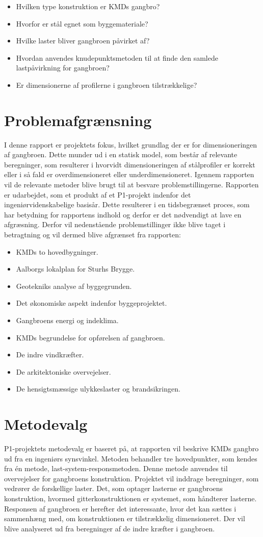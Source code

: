\begin{itemize}
\item Hvilken type konstruktion er KMDs gangbro?
\item Hvorfor er stål egnet som byggemateriale?
\item Hvilke laster bliver gangbroen påvirket af?
\item Hvordan anvendes knudepunktsmetoden til at finde den samlede lastpåvirkning for gangbroen?
\item Er dimensionerne af profilerne i gangbroen tilstrækkelige?
\end{itemize}

\section{Problemafgrænsning}
I denne rapport er projektets fokus, hvilket grundlag der er for dimensioneringen af gangbroen. Dette munder ud i en statisk model, som består af relevante beregninger, som resulterer i hvorvidt dimensioneringen af stålprofiler er korrekt eller i så fald er overdimensioneret eller underdimensioneret. Igennem rapporten vil de relevante metoder blive brugt til at besvare problemstillingerne. Rapporten er udarbejdet, som et produkt af et P1-projekt indenfor det ingeniørvidenskabelige basisår. Dette resulterer i en tidsbegrænset proces, som har betydning for rapportens indhold og derfor er det nødvendigt at lave en afgræsning. Derfor vil nedenstående problemstillinger ikke blive taget i betragtning og vil dermed blive afgrænset fra rapporten:

\begin{itemize}
\item KMDs to hovedbygninger.
\item Aalborgs lokalplan for Sturhs Brygge.
\item Geotekniks analyse af byggegrunden. 
\item Det økonomiske aspekt indenfor byggeprojektet.
\item Gangbroens energi og indeklima.
\item KMDs begrundelse for opførelsen af gangbroen.
\item De indre vindkræfter.
\item De arkitektoniske overvejelser. 
\item De hensigtsmæssige ulykkeslaster og brandsikringen.
\end{itemize}

\section{Metodevalg}
P1-projektets metodevalg er baseret på, at rapporten vil beskrive KMDs gangbro ud fra en ingeniørs synsvinkel. Metoden behandler tre hovedpunkter, som kendes fra én metode, last-system-responsmetoden. Denne metode anvendes til overvejelser for gangbroens konstruktion. Projektet vil inddrage beregninger, som vedrører de forskellige laster. Det, som optager lasterne er gangbroens konstruktion, hvormed gitterkonstruktionen er systemet, som håndterer lasterne.  Responsen af gangbroen er herefter det interessante, hvor det kan sættes i sammenhæng med, om konstruktionen er tilstrækkelig dimensioneret. Der vil blive analyseret ud fra beregninger af de indre kræfter i gangbroen.